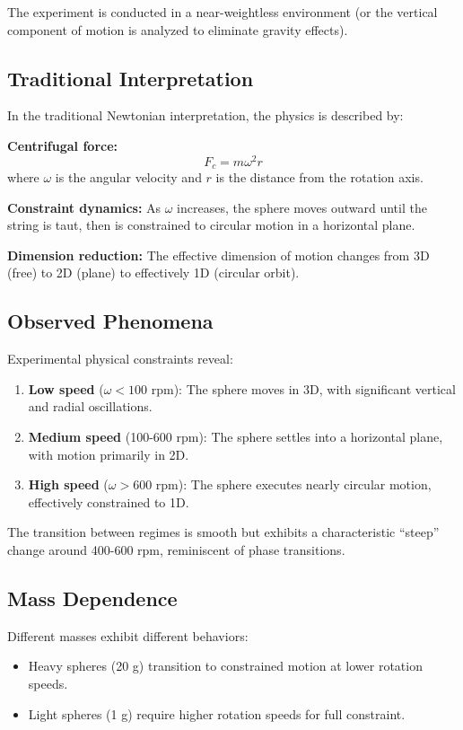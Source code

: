 \documentclass[12pt,a4paper]{article}
\begin{document}
The experiment is conducted in a near-weightless environment (or the vertical component of motion is analyzed to eliminate gravity effects).

\subsection{Traditional Interpretation}

In the traditional Newtonian interpretation, the physics is described by:

\textbf{Centrifugal force:}
\begin{equation}
    F_c = m\omega^2 r
\end{equation}
where $\omega$ is the angular velocity and $r$ is the distance from the rotation axis.

\textbf{Constraint dynamics:} As $\omega$ increases, the sphere moves outward until the string is taut, then is constrained to circular motion in a horizontal plane.

\textbf{Dimension reduction:} The effective dimension of motion changes from 3D (free) to 2D (plane) to effectively 1D (circular orbit).

\subsection{Observed Phenomena}

Experimental physical constraints reveal:
\begin{enumerate}
    \item \textbf{Low speed} ($\omega < 100$ rpm): The sphere moves in 3D, with significant vertical and radial oscillations.
    \item \textbf{Medium speed} (100-600 rpm): The sphere settles into a horizontal plane, with motion primarily in 2D.
    \item \textbf{High speed} ($\omega > 600$ rpm): The sphere executes nearly circular motion, effectively constrained to 1D.
\end{enumerate}

The transition between regimes is smooth but exhibits a characteristic ``steep'' change around 400-600 rpm, reminiscent of phase transitions.

\subsection{Mass Dependence}

Different masses exhibit different behaviors:
\begin{itemize}
    \item Heavy spheres (20 g) transition to constrained motion at lower rotation speeds.
    \item Light spheres (1 g) require higher rotation speeds for full constraint.
\end{itemize}
\end{document}
